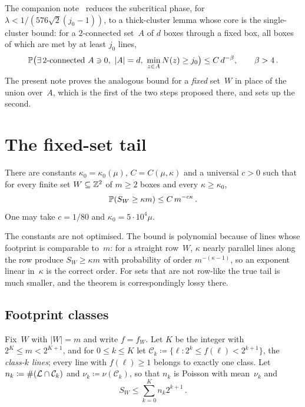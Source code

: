 \documentclass[11pt,letterpaper]{article}
\begin{document}
The companion note~\cite{FM26} reduces the subcritical phase, for $\lambda<1/(576\sqrt2(j_0-1))$, to a thick-cluster lemma whose core is the single-cluster bound: for a $2$-connected set~$A$ of $d$ boxes through a fixed box, all boxes of which are met by at least $j_0$ lines,
\begin{equation}
\label{eq:target}
  \P\bigl(\exists\,2\text{-connected }A\ni0,\ \lvert A\rvert=d,\ \min_{z\in A}N(z)\ge j_0\bigr)\le C\,d^{-\beta},\qquad\beta>4\,.
\end{equation}
The present note proves the analogous bound for a \emph{fixed} set~$W$ in place of the union over~$A$, which is the first of the two steps proposed there, and sets up the second.

\section{The fixed-set tail}
\label{sec:fixed}

\begin{theorem}
\label{thm:fixed}
There are constants $\kappa_0=\kappa_0(\mu)$, $C=C(\mu,\kappa)$ and a universal $c>0$ such that for every finite set $W\subseteq\Z^2$ of $m\ge2$ boxes and every $\kappa\ge\kappa_0$,
\begin{equation}
\label{eq:fixed}
  \P(S_W\ge\kappa m)\le C\,m^{-c\kappa}\,.
\end{equation}
One may take $c=1/80$ and $\kappa_0=5\cdot10^4\mu$.
\end{theorem}

The constants are not optimised. The bound is polynomial because of lines whose footprint is comparable to~$m$: for a straight row~$W$, $\kappa$ nearly parallel lines along the row produce $S_W\ge\kappa m$ with probability of order $m^{-(\kappa-1)}$, so an exponent linear in~$\kappa$ is the correct order. For sets that are not row-like the true tail is much smaller, and the theorem is correspondingly lossy there.

\subsection{Footprint classes}

Fix~$W$ with $\lvert W\rvert=m$ and write $f=f_W$. Let $K$ be the integer with $2^K\le m<2^{K+1}$, and for $0\le k\le K$ let $\mathcal C_k\coloneqq\{\ell\colon2^k\le f(\ell)<2^{k+1}\}$, the \emph{class-$k$ lines}; every line with $f(\ell)\ge1$ belongs to exactly one class. Let $n_k\coloneqq\#(\cL\cap\mathcal C_k)$ and $\nu_k\coloneqq\nu(\mathcal C_k)$, so that $n_k$ is Poisson with mean~$\nu_k$ and
\begin{equation}
\label{eq:classsum}
  S_W\le\sum_{k=0}^Kn_k2^{k+1}\,.
\end{equation}
\end{document}
